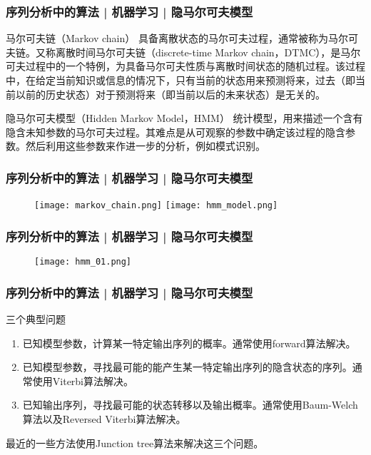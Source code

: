 \begin{frame}
  \frametitle{序列分析中的算法 | 机器学习 | 隐马尔可夫模型}
  \begin{block}{马尔可夫链（Markov chain）}
    具备离散状态的马尔可夫过程，通常被称为马尔可夫链。又称离散时间马尔可夫链（discrete-time Markov chain，DTMC），是马尔可夫过程中的一个特例，为具备马尔可夫性质与离散时间状态的随机过程。该过程中，在给定当前知识或信息的情况下，只有当前的状态用来预测将来，过去（即当前以前的历史状态）对于预测将来（即当前以后的未来状态）是无关的。
  \end{block}
  \pause
  \begin{block}{隐马尔可夫模型（Hidden Markov Model，HMM）}
    统计模型，用来描述一个含有隐含未知参数的马尔可夫过程。其难点是从可观察的参数中确定该过程的隐含参数。然后利用这些参数来作进一步的分析，例如模式识别。
  \end{block}
\end{frame}

\begin{frame}
  \frametitle{序列分析中的算法 | 机器学习 | 隐马尔可夫模型}
  \begin{figure}
    \centering
    \texttt{[image: markov\_chain.png]}
    \quad
    \texttt{[image: hmm\_model.png]}
  \end{figure}
\end{frame}

\begin{frame}
  \frametitle{序列分析中的算法 | 机器学习 | 隐马尔可夫模型}
  \begin{figure}
    \centering
    \texttt{[image: hmm\_01.png]}
  \end{figure}
\end{frame}

\begin{frame}
  \frametitle{序列分析中的算法 | 机器学习 | 隐马尔可夫模型}
  \begin{block}{三个典型问题}
    \begin{enumerate}
      \item 已知模型参数，计算某一特定输出序列的概率。通常使用forward算法解决。
      \item 已知模型参数，寻找最可能的能产生某一特定输出序列的隐含状态的序列。通常使用Viterbi算法解决。
      \item 已知输出序列，寻找最可能的状态转移以及输出概率。通常使用Baum-Welch算法以及Reversed Viterbi算法解决。
    \end{enumerate}
  \end{block}
最近的一些方法使用Junction tree算法来解决这三个问题。
\end{frame}

